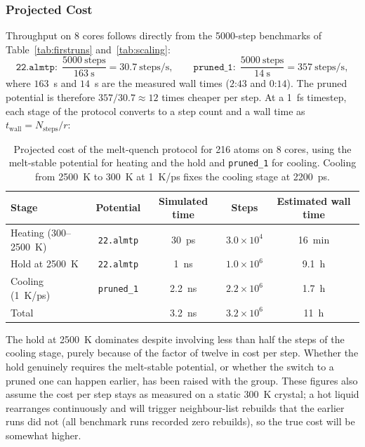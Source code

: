 \documentclass{article}
\begin{document}
\subsubsection{Projected Cost}
Throughput on 8 cores follows directly from the 5000-step benchmarks of Table~\ref{tab:firstruns} and~\ref{tab:scaling}:
\begin{equation*}
    \texttt{22.almtp}: \; \frac{5000~\text{steps}}{163~\text{s}} = 30.7~\text{steps/s},
    \qquad
    \texttt{pruned\_1}: \; \frac{5000~\text{steps}}{14~\text{s}} = 357~\text{steps/s},
\end{equation*}
where $163$~s and $14$~s are the measured wall times ($2$:$43$ and $0$:$14$). The pruned potential is therefore $357/30.7 \approx 12$ times cheaper per step. At a 1~fs timestep, each stage of the protocol converts to a step count and a wall time as $t_{\text{wall}} = N_{\text{steps}} / r$:

\begin{table}[H]
\centering
\begin{tabular}{l|c|c|c|c}
\toprule
Stage & Potential & Simulated time & Steps & Estimated wall time \\
\midrule
Heating (300--2500~K) & \texttt{22.almtp} & 30~ps & $3.0 \times 10^4$ & 16~min \\
Hold at 2500~K & \texttt{22.almtp} & 1~ns & $1.0 \times 10^6$ & 9.1~h \\
Cooling (1~K/ps) & \texttt{pruned\_1} & 2.2~ns & $2.2 \times 10^6$ & 1.7~h \\
\midrule
Total & & 3.2~ns & $3.2 \times 10^6$ & 11~h \\
\bottomrule
\end{tabular}
\caption{Projected cost of the melt-quench protocol for 216 atoms on 8 cores, using the melt-stable potential for heating and the hold and \texttt{pruned\_1} for cooling. Cooling from 2500~K to 300~K at 1~K/ps fixes the cooling stage at 2200~ps.}
\label{tab:projected_cost}
\end{table}

The hold at 2500~K dominates despite involving less than half the steps of the cooling stage, purely because of the factor of twelve in cost per step. Whether the hold genuinely requires the melt-stable potential, or whether the switch to a pruned one can happen earlier, has been raised with the group. These figures also assume the cost per step stays as measured on a static 300~K crystal; a hot liquid rearranges continuously and will trigger neighbour-list rebuilds that the earlier runs did not (all benchmark runs recorded zero rebuilds), so the true cost will be somewhat higher.
\end{document}
